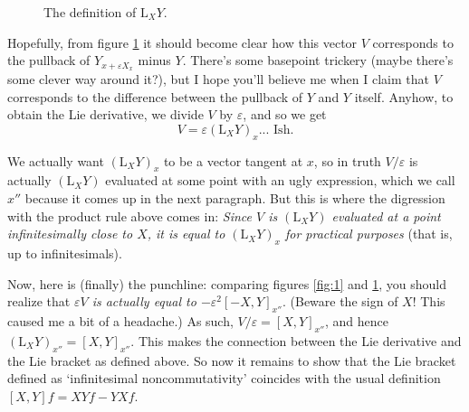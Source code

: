 \documentclass{article}
\theoremstyle{definition}
\newcommand{\Lie}{\mathrm{L}}
\begin{document}
\begin{figure}[H]
\centering
{}
\caption{The definition of $\Lie_X Y$.}\label{fig:2}
\end{figure}

Hopefully, from figure \ref{fig:2} it should become clear how this vector $V$ corresponds to the pullback of $Y_{x+\varepsilon X_x}$ minus $Y$. There's some basepoint trickery (maybe there's some clever way around it?), but I hope you'll believe me when I claim that $V$ corresponds to the difference between the pullback of $Y$ and $Y$ itself. Anyhow, to obtain the Lie derivative, we divide $V$ by $\varepsilon$, and so we get
\begin{equation}
V = \varepsilon (\Lie_X Y)_x... \text{ Ish.}
\end{equation}

We actually want $(\Lie_X Y)_x$ to be a vector tangent at $x$, so in truth $V / \varepsilon$ is actually $(\Lie_X Y)$ evaluated at some point with an ugly expression, which we call $x''$ because it comes up in the next paragraph. But this is where the digression with the product rule above comes in: \emph{Since $V$ is $(\Lie_X Y)$ evaluated at a point infinitesimally close to $X$, it is equal to $(\Lie_X Y)_x$ for practical purposes} (that is, up to infinitesimals).

Now, here is (finally) the punchline: comparing figures \ref{fig:1} and \ref{fig:2}, you should realize that \emph{$\varepsilon V$ is actually equal to $- \varepsilon^2 [-X,Y]_{x''}$}. (Beware the sign of $X$! This caused me a bit of a headache.) As such, $V/\varepsilon = [X,Y]_{x''}$, and hence $(\Lie_X Y)_{x''} = [X,Y]_{x''}$. This makes the connection between the Lie derivative and the Lie bracket as defined above. So now it remains to show that the Lie bracket defined as `infinitesimal noncommutativity' coincides with the usual definition $[X,Y] f = XY f - YX f$.
\end{document}
